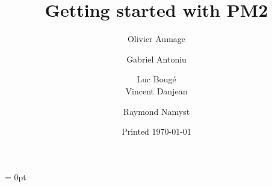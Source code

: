 \title{Getting started with PM2}

\author{Olivier Aumage \and Gabriel Antoniu \and Luc Boug\'e \\
  Vincent Danjean \and Raymond Namyst}

\date{Printed \today}

\maketitle

{\small \parskip = 0pt%
\tableofcontents
}
